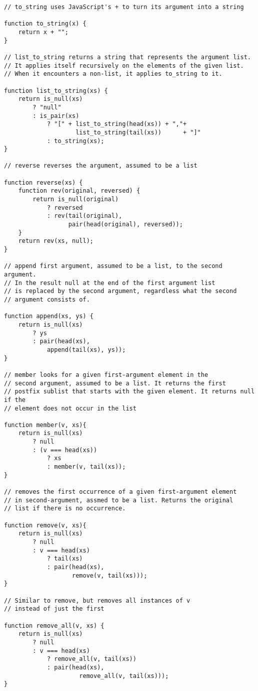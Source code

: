 \begin{lstlisting}
// to_string uses JavaScript's + to turn its argument into a string

function to_string(x) {
    return x + "";
}

// list_to_string returns a string that represents the argument list.
// It applies itself recursively on the elements of the given list.
// When it encounters a non-list, it applies to_string to it.

function list_to_string(xs) {
    return is_null(xs)
        ? "null"
        : is_pair(xs)
            ? "[" + list_to_string(head(xs)) + ","+
                    list_to_string(tail(xs))      + "]"
            : to_string(xs);
}

// reverse reverses the argument, assumed to be a list

function reverse(xs) {
    function rev(original, reversed) {
        return is_null(original)
            ? reversed
            : rev(tail(original), 
                  pair(head(original), reversed));
    }
    return rev(xs, null);
}

// append first argument, assumed to be a list, to the second argument.
// In the result null at the end of the first argument list
// is replaced by the second argument, regardless what the second
// argument consists of.

function append(xs, ys) {
    return is_null(xs)
        ? ys
        : pair(head(xs),
            append(tail(xs), ys));
} 

// member looks for a given first-argument element in the 
// second argument, assumed to be a list. It returns the first 
// postfix sublist that starts with the given element. It returns null if the 
// element does not occur in the list

function member(v, xs){
    return is_null(xs)
        ? null
        : (v === head(xs))
            ? xs
            : member(v, tail(xs));
}

// removes the first occurrence of a given first-argument element
// in second-argument, assmed to be a list. Returns the original 
// list if there is no occurrence.

function remove(v, xs){
    return is_null(xs)
        ? null
        : v === head(xs)
            ? tail(xs)
            : pair(head(xs), 
                   remove(v, tail(xs)));
}

// Similar to remove, but removes all instances of v
// instead of just the first

function remove_all(v, xs) {
    return is_null(xs)
        ? null
        : v === head(xs)
            ? remove_all(v, tail(xs))
            : pair(head(xs), 
                     remove_all(v, tail(xs)));
}


\end{lstlisting}

